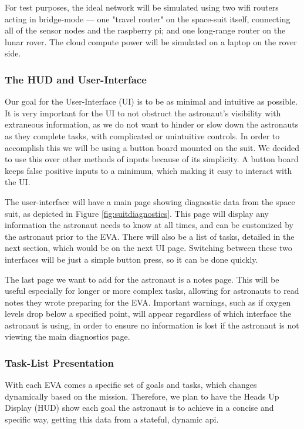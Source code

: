 \documentclass{article}
\let\Oldsubsubsection\subsubsection
\renewcommand{\subsubsection}{\FloatBarrier\Oldsubsubsection}
\begin{document}
For test purposes, the ideal network will be simulated using two wifi routers acting in bridge-mode --- one "travel router" on the space-suit itself, connecting all of the sensor nodes and the raspberry pi; and one long-range router on the lunar rover. The cloud compute power will be simulated on a laptop on the rover side.

\subsubsection{The HUD and User-Interface}

Our goal for the User-Interface (UI) is to be as minimal and intuitive as possible. It is very important for the UI to not obstruct the astronaut's visibility with extraneous information, as we do not want to hinder or slow down the astronauts as they complete tasks, with complicated or unintuitive controls. In order to accomplish this we will be using a button board mounted on the suit. We decided to use this over other methods of inputs because of its simplicity. A button board keeps false positive inputs to a minimum, which making it easy to interact with the UI.

The user-interface will have a main page showing diagnostic data from the space suit, as depicted in Figure \ref{fig:suitdiagnostics}. This page will display any information the astronaut needs to know at all times, and can be customized by the astronaut prior to the EVA. There will also be a list of tasks, detailed in the next section, which would be on the next UI page. Switching between these two interfaces will be just a simple button press, so it can be done quickly.

The last page we want to add for the astronaut is a notes page. This will be useful especially for longer or more complex tasks, allowing for astronauts to read notes they wrote preparing for the EVA. Important warnings, such as if oxygen levels drop below a specified point, will appear regardless of which interface the astronaut is using, in order to ensure no information is lost if the astronaut is not viewing the main diagnostics page.

\subsubsection{Task-List Presentation}

With each EVA comes a specific set of goals and tasks, which changes dynamically based on the mission. Therefore, we plan to have the Heads Up Display (HUD) show each goal the astronaut is to achieve in a concise and specific way, getting this data from a stateful, dynamic api.
\end{document}
